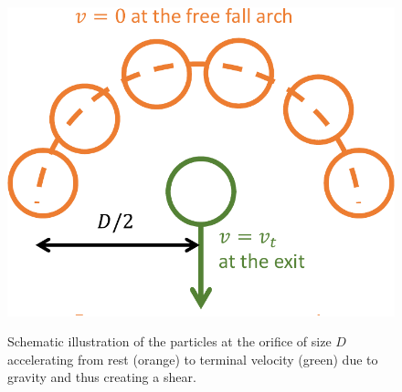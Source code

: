 \documentclass[twoside,twocolumn,9pt]{article}
\providecommand{\DIFaddbegin}{} %
\providecommand{\DIFaddend}{} %
\providecommand{\DIFdelbegin}{} %
\providecommand{\DIFdelend}{} %
\newcommand{\DIFscaledelfig}{0.5}
\newlength{\DIFdelgraphicswidth} %
\newlength{\DIFdelgraphicsheight} %
\newcommand{\DIFaddincludegraphics}[2][]{{\color{blue}\fbox{\DIFOincludegraphics[#1]{#2}}}} %
\newcommand{\DIFdelincludegraphics}[2][]{%
\sbox{\DIFdelgraphicsbox}{\DIFOincludegraphics[#1]{#2}}%
\settoboxwidth{\DIFdelgraphicswidth}{\DIFdelgraphicsbox} %
\settoboxtotalheight{\DIFdelgraphicsheight}{\DIFdelgraphicsbox} %
\scalebox{\DIFscaledelfig}{%
\parbox[b]{\DIFdelgraphicswidth}{\usebox{\DIFdelgraphicsbox}\\[-\baselineskip] \rule{\DIFdelgraphicswidth}{0em}}\llap{\resizebox{\DIFdelgraphicswidth}{\DIFdelgraphicsheight}{%
\setlength{\unitlength}{\DIFdelgraphicswidth}%
\begin{picture}(1,1)%
\thicklines\linethickness{2pt} %
{\color[rgb]{1,0,0}\put(0,0){\framebox(1,1){}}}%
{\color[rgb]{1,0,0}\put(0,0){\line( 1,1){1}}}%
{\color[rgb]{1,0,0}\put(0,1){\line(1,-1){1}}}%
\end{picture}%
}\hspace*{3pt}}} %
} %
\DeclareRobustCommand{\DIFaddbegin}{\DIFOaddbegin \let\includegraphics\DIFaddincludegraphics} %
\DeclareRobustCommand{\DIFaddend}{\DIFOaddend \let\includegraphics\DIFOincludegraphics} %
\DeclareRobustCommand{\DIFdelbegin}{\DIFOdelbegin \let\includegraphics\DIFdelincludegraphics} %
\DeclareRobustCommand{\DIFdelend}{\DIFOaddend \let\includegraphics\DIFOincludegraphics} %
\begin{document}
\DIFdelend \DIFaddbegin \begin{figure}[!t]
\centering
\includegraphics[width=0.7\columnwidth]{fig5-schematic_freefall.pdf}\\

\caption{Schematic illustration of the particles at the orifice of size $D$ accelerating from rest (orange) to terminal velocity (green) due to gravity and thus creating a shear.
\label{fig:freefall}}
\end{figure}
\DIFaddend 


\DIFdelbegin %
\end{document}
